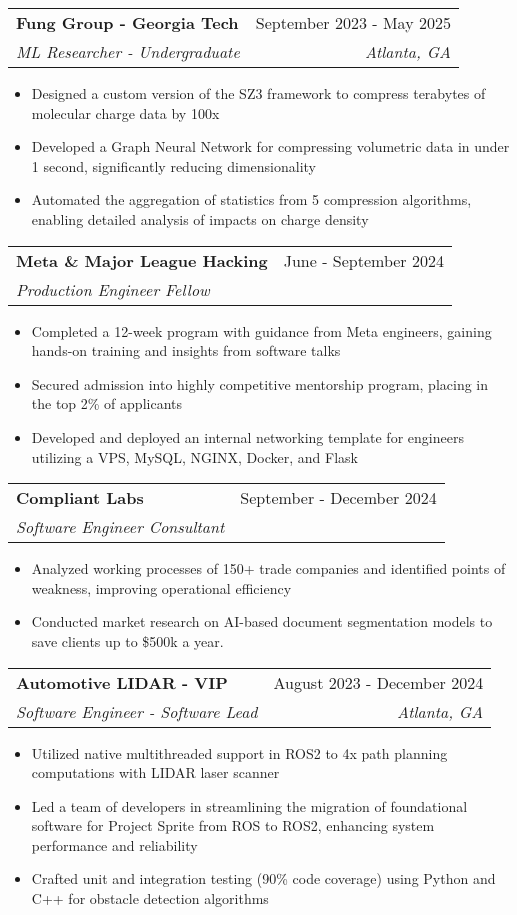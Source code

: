 \documentclass[letterpaper,10pt]{article}
\makeatletter
\newcommand{\resumeItem}[1]{
  \item\small{
    {#1 \vspace{-2pt}}
  }
}
\newcommand{\resumeSubheading}[4]{%
\vspace{-1pt}%
  \item
    \begin{tabular*}{0.97\textwidth}{l@{\extracolsep{\fill}}r}
      \textbf{#1} & #2 \\
      \textit{\small#3} & \textit{\small #4} \\

    \end{tabular*}%
  \vspace{-5pt}
}
\newcommand{\resumeItemListStart}{\begin{itemize}}
\newcommand{\resumeItemListEnd}{\end{itemize}\vspace{-5pt}}
\makeatother
\begin{document}
			\resumeSubheading
			{Fung Group - Georgia Tech}{September 2023 - May 2025}
			{ML Researcher - Undergraduate}{Atlanta, GA}
			\resumeItemListStart
				\resumeItem{Designed a custom version of the SZ3 framework to compress terabytes of molecular charge data by 100x}
				\resumeItem{Developed a Graph Neural Network for compressing volumetric data in under 1 second, significantly reducing dimensionality}
				\resumeItem{Automated the aggregation of statistics from 5 compression algorithms, enabling detailed analysis of impacts on charge density}
			\resumeItemListEnd

			\resumeSubheading
			{Meta \& Major League Hacking}{June - September 2024}
			{Production Engineer Fellow}{}
			\resumeItemListStart
				\resumeItem{Completed a 12-week program with guidance from Meta engineers, gaining hands-on training and insights from software talks}
				\resumeItem{Secured admission into highly competitive mentorship program, placing in the top 2\% of applicants}
				\resumeItem{Developed and deployed an internal networking template for engineers utilizing a VPS, MySQL, NGINX, Docker, and Flask}
			\resumeItemListEnd

			\resumeSubheading
			{Compliant Labs}{September - December 2024}
			{Software Engineer Consultant}{}
			\resumeItemListStart
				\resumeItem{Analyzed working processes of 150+ trade companies and identified points of weakness, improving operational efficiency}
				\resumeItem{Conducted market research on AI-based document segmentation models to save clients up to \$500k a year.}
			\resumeItemListEnd

			\resumeSubheading
			{Automotive LIDAR - VIP}{August 2023 - December 2024}
			{Software Engineer - Software Lead}{Atlanta, GA}
			\resumeItemListStart
				\resumeItem{Utilized native multithreaded support in ROS2 to 4x path planning computations with LIDAR laser scanner}
				\resumeItem{Led a team of developers in streamlining the migration of foundational software for Project Sprite from ROS to ROS2, enhancing system performance and reliability}
				\resumeItem{Crafted unit and integration testing (90\% code coverage) using Python and C++ for obstacle detection algorithms}
			\resumeItemListEnd
\end{document}
